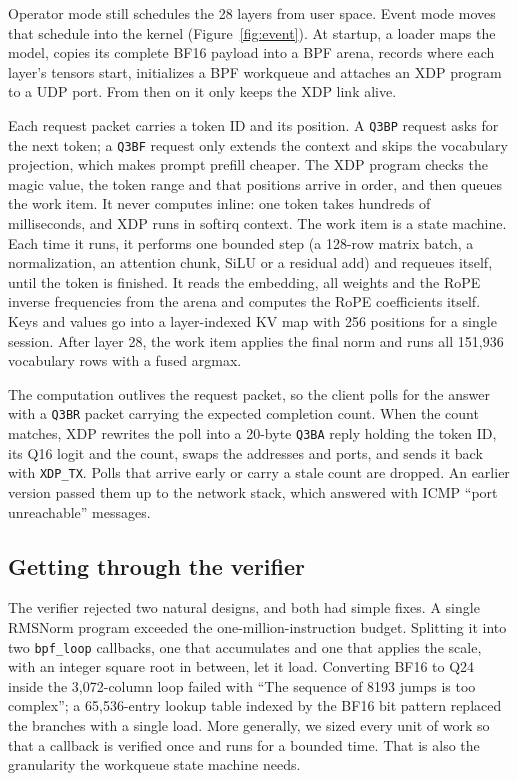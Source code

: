 \documentclass[sigconf,nonacm]{acmart}
\begin{document}
Operator mode still schedules the 28 layers from user space. Event mode moves
that schedule into the kernel (Figure~\ref{fig:event}). At startup, a loader
maps the model, copies its complete BF16 payload into a BPF arena, records
where each layer's tensors start, initializes a BPF workqueue and attaches an
XDP program to a UDP port. From then on it only keeps the XDP link alive.

Each request packet carries a token ID and its position. A \texttt{Q3BP}
request asks for the next token; a \texttt{Q3BF} request only extends the
context and skips the vocabulary projection, which makes prompt prefill
cheaper. The XDP program checks the magic value, the token range and that
positions arrive in order, and then queues the work item. It never computes
inline: one token takes hundreds of milliseconds, and XDP runs in softirq
context. The work item is a state machine. Each time it runs, it performs one
bounded step (a 128-row matrix batch, a normalization, an attention chunk,
SiLU or a residual add) and requeues itself, until the token is finished. It
reads the embedding, all weights and the RoPE inverse frequencies from the
arena and computes the RoPE coefficients itself. Keys and values go into a
layer-indexed KV map with 256 positions for a single session. After layer 28,
the work item applies the final norm and runs all 151,936 vocabulary rows
with a fused argmax.

The computation outlives the request packet, so the client polls for the
answer with a \texttt{Q3BR} packet carrying the expected completion count.
When the count matches, XDP rewrites the poll into a 20-byte \texttt{Q3BA}
reply holding the token ID, its Q16 logit and the count, swaps the addresses
and ports, and sends it back with \texttt{XDP\_TX}. Polls that arrive early or
carry a stale count are dropped. An earlier version passed them up to the
network stack, which answered with ICMP ``port unreachable'' messages.

\subsection{Getting through the verifier}
\label{sec:verifier}

The verifier rejected two natural designs, and both had simple fixes. A
single RMSNorm program exceeded the one-million-instruction budget. Splitting
it into two \texttt{bpf\_loop} callbacks, one that accumulates and one that
applies the scale, with an integer square root in between, let it load.
Converting BF16 to Q24 inside the 3,072-column loop failed with ``The
sequence of 8193 jumps is too complex''; a 65,536-entry lookup table indexed
by the BF16 bit pattern replaced the branches with a single load. More
generally, we sized every unit of work so that a callback is verified once
and runs for a bounded time. That is also the granularity the workqueue state
machine needs.
\end{document}
